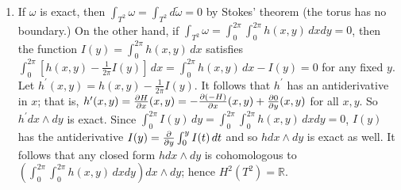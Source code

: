 \documentclass[11pt,leqno]{article}
\theoremstyle{plain}
\theoremstyle{definition}
\numberwithin{equation}{section}
\numberwithin{lem}{section}
\begin{document}
\begin{enumerate}
    \item If $\omega$ is exact, then $\int_{T^2}\omega = \int_{T^2} d\tilde \omega = 0$ by Stokes' theorem (the torus has no boundary.) On the other hand, if $\int_{T^2}\omega = \int_0^{2\pi}\int_0^{2\pi}h(x,y)\,dxdy = 0$, then the function $I(y) = \int_0^{2\pi}h(x,y)\,dx$ satisfies $\int_0^{2\pi}[h(x,y)-\frac{1}{2\pi}I(y)]\,dx = \int_0^{2\pi}h(x,y)\,dx-I(y) = 0$ for any fixed $y$. Let $h^\prime(x,y) = h(x,y) - \frac{1}{2\pi}I(y)$. It follows that $h^\prime$ has an antiderivative in $x$; that is, $h^\prime(x,y) = \pdv{H}{x}\/(x,y) = -\pdv{(-H)}{x}\/(x,y) + \pdv{0}{y}\/(x,y)$ for all $x,y$. So $h^\prime dx\wedge dy$ is exact. Since $\int_0^{2\pi}I(y)\,dy = \int_0^{2\pi}\int_0^{2\pi}h(x,y)\,dx dy = 0$, $I(y)$ has the antiderivative $I(y) = \pdv{y}\int_0^yI(t)\,dt$ and so $hdx\wedge dy$ is exact as well. It follows that any closed form $hdx\wedge dy$ is cohomologous to $(\int_0^{2\pi}\int_0^{2\pi}h(x,y)\,dx dy)dx\wedge dy$; hence $H^2(T^2) = \mathbb R$.
\end{enumerate}
\end{document}
